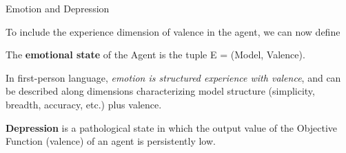  
 
 
 


\begin{frame}[label=ladila]{Emotion and Depression}
 
   To include the experience dimension of valence in the agent, we  can now define 
\begin{definition} 
The {\bf emotional state} of the Agent is the tuple E = (Model, Valence). 
\end{definition}
In first-person language, {\em emotion is structured experience with valence}, and can be described along dimensions characterizing model structure (simplicity, breadth, accuracy, etc.) plus valence.  
  \begin{definition} 
{\bf Depression} is a pathological state in which the output value of the Objective Function (valence) of an agent is persistently low.
\end{definition}
    
 
\end{frame}



